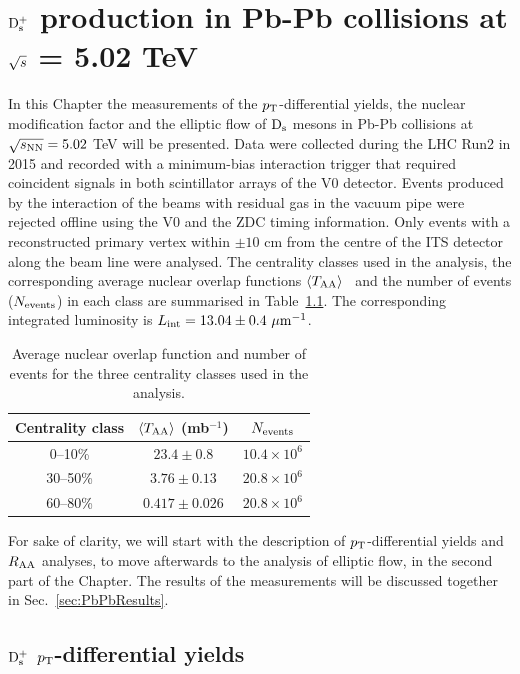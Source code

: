 \chapter{${\rm D_s^+}$ production in Pb-Pb collisions at $\sqrt{s}$ = 5.02 TeV}
\label{chap:PbPb}
In this Chapter the measurements of the $p_{\rm T}$-differential yields,
the nuclear modification factor and the elliptic flow of ${\rm D_s}$ mesons
in Pb-Pb collisions at $\sqrt{s_{\rm NN}} = 5.02$ TeV will be presented. Data were
collected during the LHC Run2 in 2015 and recorded with a 
minimum-bias interaction trigger that required coincident signals in 
both scintillator arrays of the V0 detector. Events produced by 
the interaction of the beams with residual gas in the
vacuum pipe were rejected offline using the V0 and the ZDC 
timing information. Only events with a reconstructed primary vertex 
within $\pm 10$ cm from the centre of the ITS detector along
the beam line were analysed. The centrality classes 
used in the analysis, the corresponding 
average nuclear overlap functions $\left\langle T_{\rm AA} \right\rangle$~\cite{ALICE-PUBLIC-2015-008} 
and the number of events ($N_{\rm events}$) in each class 
are summarised in Table~\ref{tab:Nevents}. The corresponding 
integrated luminosity is $L_{\rm int}=13.04\pm0.4~\mathrm{\mu m}^{-1}$.\\
\begin{table}[!h]
	\centering
	\begin{tabular}{ccc}
	\hline
	Centrality class & $\langle T_{\rm AA}\rangle$ (mb$^{-1}$)& $N_{\rm events}$\\
	\hline
	\phantom{0}0--10\% & $23.4\pm0.8$ & $10.4 \times 10^6$ \\
	30--50\% & $3.76\pm0.13$ & $20.8 \times 10^6$\\
	60--80\% & $0.417 \pm 0.026$ & $20.8 \times 10^6$\\
	\hline
	\end{tabular}		
	\caption{Average nuclear overlap function and number of events  for the three centrality classes used in the analysis.}
	\label{tab:Nevents}
\end{table}

For sake of clarity, we will start with the description of $p_{\rm T}$-differential yields and $R_{\rm AA}$ 
analyses, to move afterwards to the analysis of elliptic flow, in the second part of the Chapter. 
The results of the measurements will be discussed together in Sec.~\ref{sec:PbPbResults}.

\section{${\rm D_s^+}$ $p_{\rm T}$-differential yields}
\label{sec:YieldsAndRaa}

